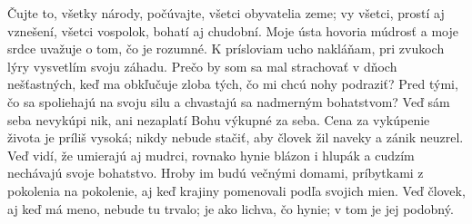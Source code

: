 Čujte to, všetky národy,
počúvajte, všetci obyvatelia zeme;
\versseparator
vy všetci, prostí aj vznešení,
všetci vospolok, bohatí aj chudobní.
\versseparator
Moje ústa hovoria múdrosť
a moje srdce uvažuje o tom, čo je rozumné.
\versseparator
K prísloviam ucho nakláňam,
pri zvukoch lýry vysvetlím svoju záhadu.
\versseparator
Prečo by som sa mal strachovať v dňoch nešťastných,
keď ma obkľučuje zloba tých, čo mi chcú nohy podraziť?
\versseparator
Pred tými, čo sa spoliehajú na svoju silu
a chvastajú sa nadmerným bohatstvom?
\versseparator
Veď sám seba nevykúpi nik,
ani nezaplatí Bohu výkupné za seba.
\versseparator
Cena za vykúpenie života je príliš vysoká;
nikdy nebude stačiť,
aby človek žil naveky a zánik neuzrel.
\versseparator
Veď vidí, že umierajú aj mudrci,
rovnako hynie blázon i hlupák
\versseparator
a cudzím nechávajú svoje bohatstvo.
Hroby im budú večnými domami,
\versseparator
príbytkami z pokolenia na pokolenie,
aj keď krajiny pomenovali podľa svojich mien.
\versseparator
Veď človek, aj keď má meno, nebude tu trvalo;
je ako lichva, čo hynie;
v tom je jej podobný. 